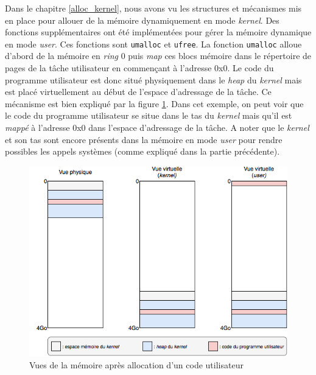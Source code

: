Dans le chapitre \ref{alloc_kernel}, nous avons vu les structures et mécanismes
mis en place pour allouer de la mémoire dynamiquement en mode \textit{kernel}.
Des fonctions supplémentaires ont été implémentées pour gérer la mémoire dynamique en
mode \textit{user}. Ces fonctions sont \texttt{umalloc} et
\texttt{ufree}. La fonction \texttt{umalloc} alloue d'abord
de la mémoire en \textit{ring} 0 puis \textit{map} ces blocs mémoire
dans le répertoire de pages de la tâche utilisateur en commençant à l'adresse 0x0.
Le code du programme utilisateur est donc situé physiquement dans le \textit{heap}
du \textit{kernel} mais est placé virtuellement au début de l'espace d'adressage
de la tâche. Ce mécanisme est bien expliqué par la figure \ref{mem_view_user}.
Dans cet exemple, on peut voir que le code du programme utilisateur se situe
dans le tas du \textit{kernel} mais qu'il est \textit{mappé} à l'adresse 0x0
dans l'espace d'adressage de la tâche. A noter que le \textit{kernel} et son tas
sont encore présents dans la mémoire en mode \textit{user} pour rendre possibles
les appels systèmes (comme expliqué dans la partie précédente).

\begin{figure}[!h]
  \centering
  \includegraphics[scale=.7]{images/alloc_user.png}
  \caption{Vues de la mémoire après allocation d'un code utilisateur}
  \label{mem_view_user}
\end{figure}


